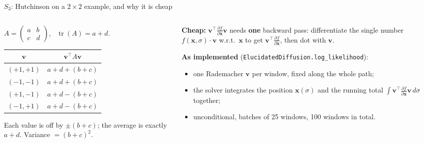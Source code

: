 \documentclass[aspectratio=169,11pt]{beamer}
\DeclareMathOperator{\tr}{tr}
\newcommand{\x}{\bm{x}}
\newcommand{\vv}{\bm{v}}
\begin{document}
\begin{frame}{$S_3$: Hutchinson on a $2\times2$ example, and why it is cheap}
\small
\begin{columns}[T]
\begin{column}{0.48\linewidth}
$A=\begin{pmatrix}a&b\\c&d\end{pmatrix}$, \ $\tr(A)=a+d$.
\vspace{0.4em}

\centering
\begin{tabular}{cc}
\toprule
$\vv$ & $\vv^\top A\vv$\\
\midrule
$(+1,+1)$ & $a+d+(b+c)$\\
$(-1,-1)$ & $a+d+(b+c)$\\
$(+1,-1)$ & $a+d-(b+c)$\\
$(-1,+1)$ & $a+d-(b+c)$\\
\bottomrule
\end{tabular}
\vspace{0.4em}

\raggedright Each value is off by $\pm(b+c)$; the average is exactly $a+d$. Variance $=(b+c)^2$.
\end{column}
\begin{column}{0.5\linewidth}
\textbf{Cheap:} $\vv^\top\frac{\partial f}{\partial\x}\vv$ needs \textbf{one} backward pass: differentiate the single number $f(\x,\sigma)\cdot\vv$ w.r.t.\ $\x$ to get $\vv^\top\frac{\partial f}{\partial\x}$, then dot with $\vv$.
\vspace{0.5em}

\textbf{As implemented} (\texttt{ElucidatedDiffusion.log\_likelihood}):
\begin{itemize}
\item one Rademacher $\vv$ per window, fixed along the whole path;
\item the solver integrates the position $\x(\sigma)$ and the running total $\int\vv^\top\frac{\partial f}{\partial\x}\vv\,d\sigma$ together;
\item unconditional, batches of 25 windows, 100 windows in total.
\end{itemize}
\end{column}
\end{columns}
\end{frame}
\end{document}
